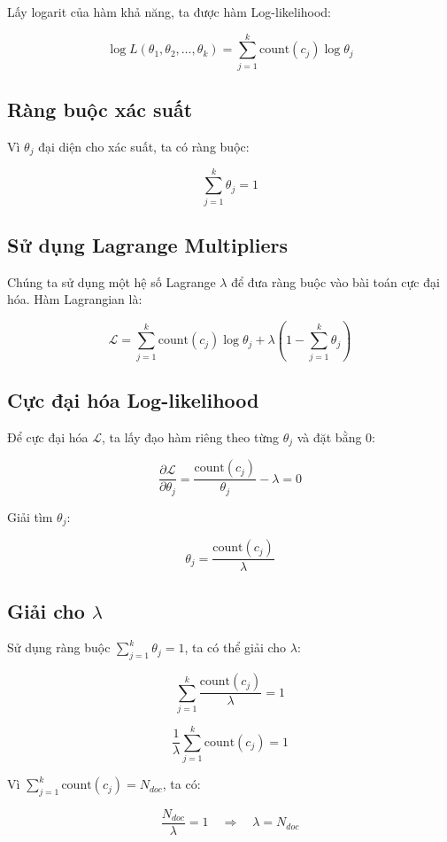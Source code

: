 \documentclass[a4paper, 15pt]{article}
\begin{document}
Lấy logarit của hàm khả năng, ta được hàm Log-likelihood:

\[
    \log L(\theta_1, \theta_2, \dots, \theta_k) = \sum_{j=1}^k \text{count}(c_j) \log \theta_j
\]

\subsection*{Ràng buộc xác suất}

Vì \( \theta_j \) đại diện cho xác suất, ta có ràng buộc:

\[
    \sum_{j=1}^k \theta_j = 1
\]

\subsection*{Sử dụng Lagrange Multipliers}

Chúng ta sử dụng một hệ số Lagrange \( \lambda \) để đưa ràng buộc vào bài toán cực đại hóa. Hàm Lagrangian là:

\[
    \mathcal{L} = \sum_{j=1}^k \text{count}(c_j) \log \theta_j + \lambda \left( 1 - \sum_{j=1}^k \theta_j \right)
\]

\subsection*{Cực đại hóa Log-likelihood}

Để cực đại hóa \( \mathcal{L} \), ta lấy đạo hàm riêng theo từng \( \theta_j \) và đặt bằng 0:

\[
    \frac{\partial \mathcal{L}}{\partial \theta_j} = \frac{\text{count}(c_j)}{\theta_j} - \lambda = 0
\]

Giải tìm \( \theta_j \):

\[
    \theta_j = \frac{\text{count}(c_j)}{\lambda}
\]

\subsection*{Giải cho \( \lambda \)}

Sử dụng ràng buộc \( \sum_{j=1}^k \theta_j = 1 \), ta có thể giải cho \( \lambda \):

\[
    \sum_{j=1}^k \frac{\text{count}(c_j)}{\lambda} = 1
\]

\[
    \frac{1}{\lambda} \sum_{j=1}^k \text{count}(c_j) = 1
\]

Vì \( \sum_{j=1}^k \text{count}(c_j) = N_{doc} \), ta có:

\[
    \frac{N_{doc}}{\lambda} = 1 \quad \Rightarrow \quad \lambda = N_{doc}
\]
\end{document}
